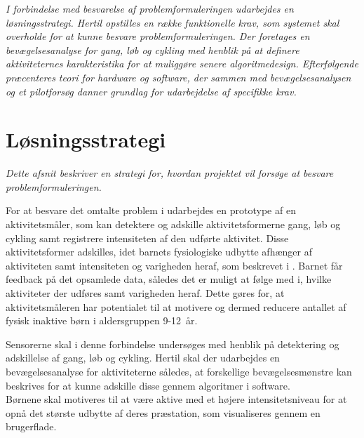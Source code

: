 \textit{I forbindelse med besvarelse af problemformuleringen udarbejdes en løsningsstrategi. Hertil opstilles en række funktionelle krav, som systemet skal overholde for at kunne besvare problemformuleringen. Der foretages en bevægelsesanalyse for gang, løb og cykling med henblik på at definere aktiviteternes karakteristika for at muliggøre senere algoritmedesign. Efterfølgende præcenteres teori for hardware og software, der sammen med bevægelsesanalysen og et pilotforsøg danner grundlag for udarbejdelse af specifikke krav.}

\section{Løsningsstrategi}
\textit{Dette afsnit beskriver en strategi for, hvordan projektet vil forsøge at besvare problemformuleringen.}

For at besvare det omtalte problem i  udarbejdes en prototype af en aktivitetsmåler, som kan detektere og adskille aktivitetsformerne gang, løb og cykling samt registrere intensiteten af den udførte aktivitet. Disse aktivitetsformer adskilles, idet barnets fysiologiske udbytte afhænger af aktiviteten samt intensiteten og varigheden heraf, som beskrevet i . Barnet får feedback på det opsamlede data, således det er muligt at følge med i, hvilke aktiviteter der udføres samt varigheden heraf. Dette gøres for, at aktivitetsmåleren har potentialet til at motivere og dermed reducere antallet af fysisk inaktive børn i aldersgruppen 9-12~år.

Sensorerne skal i denne forbindelse undersøges med henblik på detektering og adskillelse af gang, løb og cykling. Hertil skal der udarbejdes en bevægelsesanalyse for aktiviteterne således, at forskellige bevægelsesmønstre kan beskrives for at kunne adskille disse gennem algoritmer i software.\\
Børnene skal motiveres til at være aktive med et højere intensitetsniveau for at opnå det største udbytte af deres præstation, som visualiseres gennem en brugerflade. 


